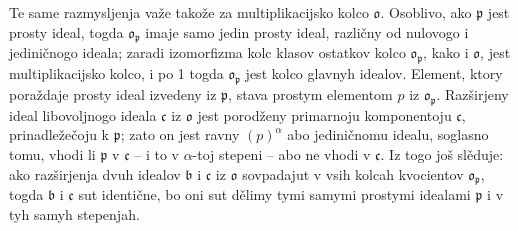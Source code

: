 \documentclass[11pt]{article}
\newcommand{\mo}{\mathfrak{o}}
\newcommand{\mb}{\mathfrak{b}}
\newcommand{\mc}{\mathfrak{c}}
\newcommand{\mpideal}{\mathfrak{p}}
\begin{document}
\setcounter{footnote}{37}

\noindent Te same razmysljenja važe takože za multiplikacijsko kolco $\mo$. Osoblivo, ako $\mpideal$ jest prosty ideal, togda $\mo_\mpideal$ imaje samo jedin prosty ideal, različny od nulovogo i jediničnogo ideala; zaradi izomorfizma kolc klasov ostatkov kolco $\mo_\mpideal$, kako i $\mo$, jest multiplikacijsko kolco, i po 1 togda $\mo_\mpideal$ jest kolco glavnyh idealov. Element, ktory poraždaje prosty ideal izvedeny iz $\mpideal$, stava prostym elementom $p$ iz $\mo_\mpideal$. Razširjeny ideal libovoljnogo ideala $\mc$ iz $\mo$ jest porodženy primarnoju komponentoju $\mc$, prinadležečoju k $\mpideal$; zato on jest ravny $(p)^\alpha$ abo jediničnomu idealu, soglasno tomu, vhodi li $\mpideal$ v $\mc$ -- i to v $\alpha$-toj stepeni -- abo ne vhodi v $\mc$. Iz togo još slěduje: ako razširjenja dvuh idealov $\mb$ i $\mc$ iz $\mo$ sovpadajut v vsih kolcah kvocientov $\mo_\mpideal$, togda $\mb$ i $\mc$ sut identične, bo oni sut dělimy tymi samymi prostymi idealami $\mpideal$ i v tyh samyh stepenjah.
\end{document}
